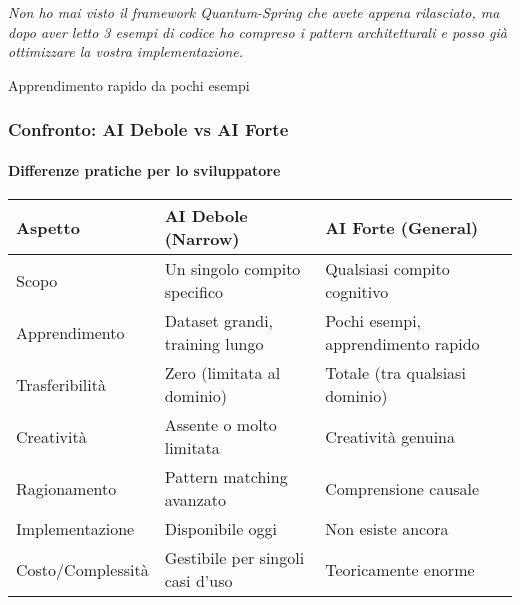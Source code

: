 \begin{frame}[t,fragile]
{{		\begin{minipage}[t]{\textwidth}
			\begin{minipage}[t]{0.6\textwidth}
				\renewcommand{\epigraphsize}{\scriptsize}
				\setlength{\afterepigraphskip}{0pt}
				\setlength{\beforeepigraphskip}{5pt}
				\setlength{\epigraphwidth}{0.9\textwidth}
				\epigraph{\textit{Non ho mai visto il framework Quantum-Spring che avete appena rilasciato, ma dopo aver letto 3 esempi di codice ho compreso i pattern architetturali e posso già ottimizzare la vostra implementazione.}}{Apprendimento rapido da pochi esempi}
			\end{minipage}
		\end{minipage}
		}
	}
\end{frame}
%
\begin{frame}[t,fragile] \frametitle{Confronto: AI Debole vs AI Forte}
	{\small
		\framesubtitle{Differenze pratiche per lo sviluppatore}
		\vspace*{-.5cm}
		\begin{center}
		{\scriptsize
		\begin{table}
			\setlength{\tabcolsep}{4pt}
			\renewcommand{\arraystretch}{1.5}
			\centering
			\begin{tabularx}{\textwidth}{p{2cm}XX}
				\toprule
				\textbf{Aspetto} & \textbf{AI Debole (Narrow)} & \textbf{AI Forte (General)}\\
				\midrule
				\alert{Scopo} & Un singolo compito specifico & Qualsiasi compito cognitivo\\
				\alert{Apprendimento} & Dataset grandi, training lungo & Pochi esempi, apprendimento rapido\\
				\alert{Trasferibilità} & Zero (limitata al dominio) & Totale (tra qualsiasi dominio)\\
				\alert{Creatività} & Assente o molto limitata & Creatività genuina\\
				\alert{Ragionamento} & Pattern matching avanzato & Comprensione causale\\
				\alert{Implementazione} & Disponibile oggi & Non esiste ancora\\
				\alert{Costo/Complessità} & Gestibile per singoli casi d'uso & Teoricamente enorme\\
				\bottomrule
			\end{tabularx}
		\end{table}
		}
		\end{center}
	}
\end{frame}
%